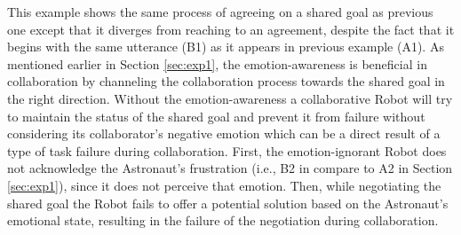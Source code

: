 This example shows the same process of agreeing on a shared goal as previous
one except that it diverges from reaching to an agreement, despite the fact
that it begins with the same utterance (B1) as it appears in previous example
(A1). As mentioned earlier in Section \ref{sec:exp1}, the emotion-awareness is
beneficial in collaboration by channeling the collaboration process towards the
shared goal in the right direction. Without the emotion-awareness a
collaborative Robot will try to maintain the status of the shared goal and
prevent it from failure without considering its collaborator's negative emotion
which can be a direct result of a type of task failure during collaboration.
First, the emotion-ignorant Robot does not acknowledge the Astronaut's
frustration (i.e., B2 in compare to A2 in Section \ref{sec:exp1}), since it does
not perceive that emotion. Then, while negotiating the shared goal the Robot
fails to offer a potential solution based on the Astronaut's emotional state,
resulting in the failure of the negotiation during collaboration.

